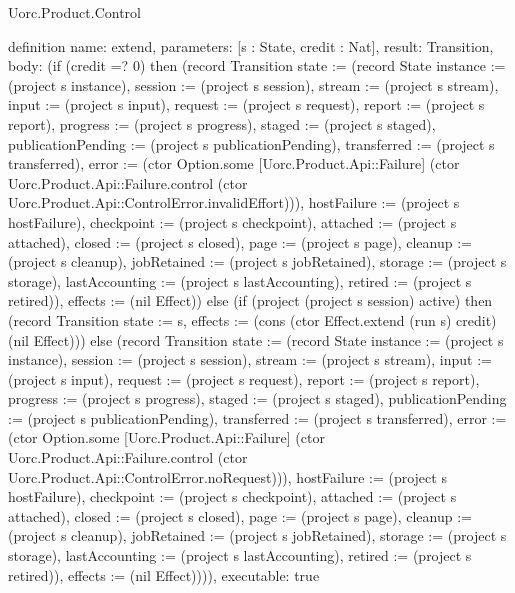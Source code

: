 \begin{lexlean}{Uorc.Product.Control}
\begin{semanticmodule}
definition{
  name: extend,
  parameters: [s : State, credit : Nat],
  result: Transition,
  body: (if (credit =? 0) then (record Transition {state := (record State {instance := (project s instance), session := (project s session), stream := (project s stream), input := (project s input), request := (project s request), report := (project s report), progress := (project s progress), staged := (project s staged), publicationPending := (project s publicationPending), transferred := (project s transferred), error := (ctor Option.some [Uorc.Product.Api::Failure] (ctor Uorc.Product.Api::Failure.control (ctor Uorc.Product.Api::ControlError.invalidEffort))), hostFailure := (project s hostFailure), checkpoint := (project s checkpoint), attached := (project s attached), closed := (project s closed), page := (project s page), cleanup := (project s cleanup), jobRetained := (project s jobRetained), storage := (project s storage), lastAccounting := (project s lastAccounting), retired := (project s retired)}), effects := (nil Effect)}) else (if (project (project s session) active) then (record Transition {state := s, effects := (cons (ctor Effect.extend (run s) credit) (nil Effect))}) else (record Transition {state := (record State {instance := (project s instance), session := (project s session), stream := (project s stream), input := (project s input), request := (project s request), report := (project s report), progress := (project s progress), staged := (project s staged), publicationPending := (project s publicationPending), transferred := (project s transferred), error := (ctor Option.some [Uorc.Product.Api::Failure] (ctor Uorc.Product.Api::Failure.control (ctor Uorc.Product.Api::ControlError.noRequest))), hostFailure := (project s hostFailure), checkpoint := (project s checkpoint), attached := (project s attached), closed := (project s closed), page := (project s page), cleanup := (project s cleanup), jobRetained := (project s jobRetained), storage := (project s storage), lastAccounting := (project s lastAccounting), retired := (project s retired)}), effects := (nil Effect)}))),
  executable: true
}


\end{semanticmodule}
\end{lexlean}
